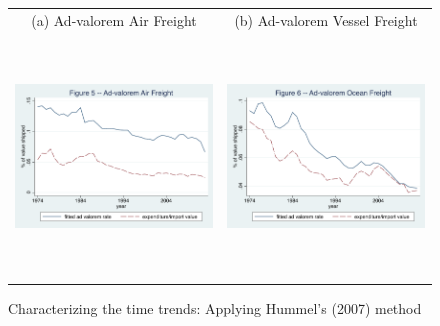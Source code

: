 \documentclass[a4paper,11pt]{article}
\begin{document}
\begin{figure}[htbp]
\caption{Characterizing the time trends: Applying Hummel's (2007) method }
\label{fig:comp_effects_as_in_Hummels}
\begin{center}
\begin{tabular}{cc}
{\small (a) Ad-valorem Air Freight} & {\small (b) Ad-valorem Vessel Freight}\\
\includegraphics[width=3in, height=2.5in]{figure5_comme_hummels_air.pdf}
& \includegraphics[width=3in,height=2.5in]{figure6_comme_hummels_ocean.pdf} \\
\end{tabular}
\end{center}
\end{figure}
\end{document}
